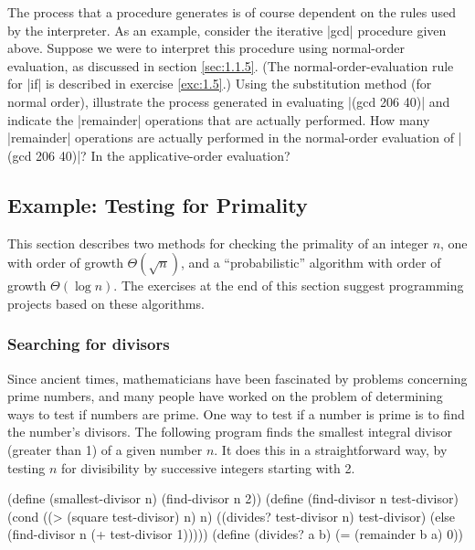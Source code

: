 \begin{Exercise}
\label{exc:1.20}
The process that a procedure generates is of course dependent on the
rules used by the interpreter.  As an example, consider the iterative
\scheme|gcd| procedure given above.  Suppose we were to interpret this
procedure using normal-order evaluation, as discussed in section
\ref{sec:1.1.5}.  (The normal-order-evaluation rule for \scheme|if| is
described in exercise \ref{exc:1.5}.)  Using the substitution method
(for normal order), illustrate the process generated in evaluating
\scheme|(gcd 206 40)| and indicate the \scheme|remainder| operations
that are actually performed.  How many \scheme|remainder| operations
are actually performed in the normal-order evaluation of \scheme|(gcd
206 40)|?  In the applicative-order evaluation?
\end{Exercise}

\subsection{Example: Testing for Primality}
\label{sec:1.2.6}



This section describes two methods for checking the primality of an
integer $n$, one with order of growth $\Theta(\sqrt n)$, and a
``probabilistic'' algorithm with order of growth $\Theta(\log n)$.
The exercises at the end of this section suggest programming projects
based on these algorithms.

\subsubsection*{Searching for divisors}

Since ancient times, mathematicians have been fascinated by problems
concerning prime numbers, and many people have worked on the problem
of determining ways to test if numbers are prime.  One way
to test if a number is prime is to find the number's divisors.  The
following program finds the smallest integral divisor (greater than 1)
of a given number $n$.  It does this in a straightforward way, by
testing $n$ for divisibility by successive integers starting with 2.

\begin{schemedisplay}
(define (smallest-divisor n)
  (find-divisor n 2))
(define (find-divisor n test-divisor)
  (cond ((> (square test-divisor) n) n)
        ((divides? test-divisor n) test-divisor)
        (else (find-divisor n (+ test-divisor 1)))))
(define (divides? a b)
  (= (remainder b a) 0))
\end{schemedisplay}

